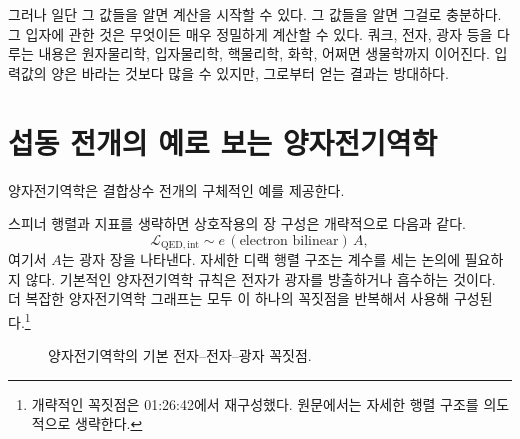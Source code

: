 그러나 일단 그 값들을 알면 계산을 시작할 수 있다. 그 값들을 알면 그걸로 충분하다. 그 입자에 관한 것은 무엇이든 매우 정밀하게 계산할 수 있다. 쿼크, 전자, 광자 등을 다루는 내용은 원자물리학, 입자물리학, 핵물리학, 화학, 어쩌면 생물학까지 이어진다. 입력값의 양은 바라는 것보다 많을 수 있지만, 그로부터 얻는 결과는 방대하다.

\section{섭동 전개의 예로 보는 양자전기역학}

양자전기역학은 결합상수 전개의 구체적인 예를 제공한다.

\begin{classroomqa}
\end{classroomqa}

스피너 행렬과 지표를 생략하면 상호작용의 장 구성은 개략적으로 다음과 같다.
\begin{equation}
\mathcal{L}_{\mathrm{QED,int}}
\sim e\,(\text{electron bilinear})\,A,
\end{equation}
여기서 \(A\)는 광자 장을 나타낸다. 자세한 디랙 행렬 구조는 계수를 세는 논의에 필요하지 않다. 기본적인 양자전기역학 규칙은 전자가 광자를 방출하거나 흡수하는 것이다. 더 복잡한 양자전기역학 그래프는 모두 이 하나의 꼭짓점을 반복해서 사용해 구성된다.\footnote{개략적인 꼭짓점은 01:26:42에서 재구성했다. 원문에서는 자세한 행렬 구조를 의도적으로 생략한다.}

\begin{figure}[htbp]
\centering
{}
\caption{양자전기역학의 기본 전자--전자--광자 꼭짓점.}
\end{figure}

\begin{classroomqa}
\end{classroomqa}

